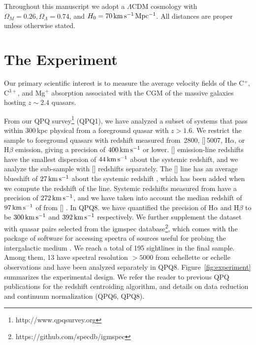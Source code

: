 \documentclass[iop]{emulateapj}
\begin{document}
Throughout this manuscript we adopt a $\Lambda$CDM cosmology with $\Omega_M=0.26, \Omega_\Lambda
=0.74$, and $H_0=70\,{\rm km\,s^{-1}\,Mpc^{-1}}$. All distances are proper unless otherwise 
stated. 

\section{The Experiment}
\label{sec:data}

Our primary scientific interest is to measure the average velocity fields of the C$^+$, C$^{3+}$, 
and Mg$^+$ absorption associated with the CGM of the massive galaxies hosting $z\sim 2.4$ quasars. 

From our QPQ survey\footnote{http://www.qpqsurvey.org} (QPQ1), we have analyzed a subset of  
systems that pass within 300\,kpc physical from a foreground quasar with $z > 1.6$. We restrict
 the sample to foreground quasars with redshift measured from \,2800, 
[]\,5007, H$\alpha$, or H$\beta$ emission, giving a precision of 
$400\,{\rm km\,s^{-1}}$ or lower. 
[] emission-line redshifts have the smallest dispersion of $44\,{\rm km\,s^{-1}}$ about 
the systemic redshift, and we analyze the sub-sample with [] redshifts separately. 
The [] line has an average blueshift of $27\,{\rm km\,s^{-1}}$ about the systemic 
redshift \citep{Boroson05}, which has been added when we compute the 
redshift of the line. Systemic redshifts measured from  have a precision of 
$272\,{\rm km\,s^{-1}}$, and we have taken into account the median redshift of 
$97\,{\rm km\,s^{-1}}$ of  from [] \citep{Richards+02}. In QPQ8. we have 
quantified the precision of H$\alpha$ and H$\beta$ to be 
$300\,{\rm km\,s^{-1}}$ and $392\,{\rm km\,s^{-1}}$ respectively. We further supplement the 
dataset with quasar pairs selected from the igmspec 
database\footnote{https://github.com/specdb/igmspec}, which comes with the package of software for
accessing spectra of sources useful for probing the intergalactic medium \citep{Prochaska17}. 
We reach a total of 195 sightlines in the final sample. Among them, 13 have spectral resolution 
$> 5000$ from echellette or echelle observations and have been analyzed separately in QPQ8. 
Figure~\ref{fig:experiment} summarizes the experimental design. We refer the reader to previous 
QPQ publications for the redshift centroiding algorithm, and details on data reduction and 
continuum normalization (QPQ6, QPQ8). 
\end{document}
